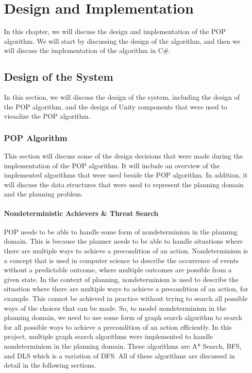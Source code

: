 \chapter{Design and Implementation}
\label{chap:design_and_implementation}

In this chapter, we will discuss the design and implementation of the \ac{POP} algorithm.
We will start by discussing the design of the algorithm,
and then we will discuss the implementation of the algorithm in C\#.

\section{Design of the System}
In this section, we will discuss the design of the system, including the design of the \ac{POP} algorithm, and the design of Unity components that were used to visualize the \ac{POP} algorithm.
\subsection[POP Algorithm]{\ac{POP} Algorithm} \label{subsec:pop_algorithm_design}

This section will discuss some of the design decisions that were made during the implementation of the \ac{POP} algorithm. It will include an overview of the implemented algorithms that were used beside the \ac{POP} algorithm. In addition, it will discuss the data structures that were used to represent the planning domain and the planning problem.

\subsubsection{Nondeterministic Achievers \& Threat Search} \label {subsubsec:nondeterministic_achievers_threat_search}
\acf{POP} needs to be able to handle some form of nondeterminism in the planning domain. This is because the planner needs
to be able to handle situations where there are multiple ways to achieve a precondition
of an action. Nondeterminism is a concept that is used in computer science to describe the occurrence of events without a predictable outcome, where multiple outcomes are possible from a given state. In the context of planning, nondeterminism is used to describe the situation where there are multiple ways to achieve a precondition of an action, for example.
This cannot be achieved in practice without trying to search all possible ways of the choices that can be made.
So, to model nondeterminism in the planning domain, we need to use some form of graph search algorithm to search for all possible ways to achieve a precondition of an action efficiently. In this project, multiple graph search algorithms were implemented to handle nondeterminism in the planning domain. These algorithms are \ac{A*} Search, \ac{BFS}, and \ac{DLS} which is a variation of \ac{DFS}. All of these algorithms are discussed in detail in the following sections.


